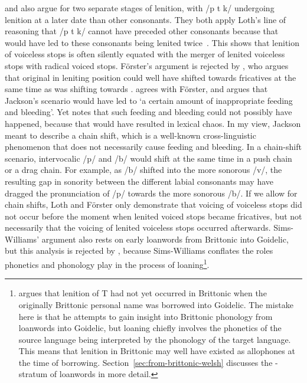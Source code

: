 \Textcite[162]{Foer_Flussname41} and \Textcite{sims-williams_dating_1990} also argue for two separate stages of lenition, with /p t k/ undergoing lenition at a later date than other consonants.
They both apply Loth's line of reasoning that /p t k/ cannot have preceded other consonants because that would have led to these consonants being lenited twice~\autocite[\eg][232]{sims-williams_dating_1990}. This shows that lenition of voiceless stops is often silently equated with the merger of lenited voiceless stops with radical voiced stops. Förster's argument is rejected by \textcite[§~131]{jackson_language_1953}, who argues that original  in leniting position could well have shifted towards fricatives at the same time as  was shifting towards . \Textcite[5]{Tho_Brythonic90} agrees with Förster, and argues that Jackson's scenario would have led to `a certain amount of inappropriate feeding and bleeding'. Yet \textcite[243]{Rus_Introduction95} notes that such feeding and bleeding could not possibly have happened, because that would have resulted in lexical chaos. In my view, Jackson meant to describe a chain shift, which is a well-known cross-linguistic phenomenon that does not necessarily cause feeding and bleeding. In a chain-shift scenario, intervocalic /p/ and /b/ would shift at the same time in a push chain or a drag chain. For example, as /b/ shifted into the more sonorous /v/, the resulting gap in sonority between the different labial consonants may have dragged the pronunciation of /p/ towards the more sonorous /b/. If we allow for chain shifts, Loth and Förster only demonstrate that voicing of voiceless stops did not occur before the moment when lenited voiced stops became fricatives, but not necessarily that the voicing of lenited voiceless stops occurred afterwards.  Sims-Williams' argument also rests on early loanwords from Brittonic into Goidelic, but this analysis is rejected by \textcite{isaac_chronology_2004}, because Sims-Williams conflates the roles  phonetics and phonology play in the process of loaning\footnote{\Textcite{sims-williams_dating_1990} argues that lenition of \gls{T} had not yet occurred in Brittonic when the originally Brittonic personal name  was borrowed into Goidelic.  The mistake here is that he attempts to gain insight into Brittonic phonology from loanwords into Goidelic, but loaning chiefly involves the phonetics of the source language being interpreted by the phonology of the target language. This means that lenition in Brittonic may well have existed as allophones at the time of borrowing. Section~\ref{sec:from-brittonic-welsh} discusses the -stratum of loanwords in more detail.}.

